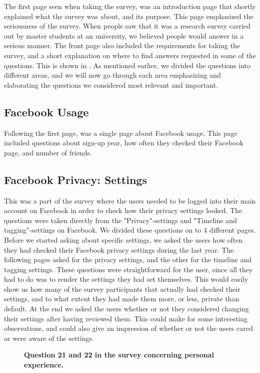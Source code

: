 The first page seen when taking the survey, was an introduction page that shortly explained what the survey was about, and its purpose. This page emphasized the seriousness of the survey. When people saw that it was a research survey carried out by master students at an university, we believed people would answer in a serious manner. The front page also included the requirements for taking the survey, and a short explanation on where to find answers requested in some of the questions. This is shown in . As mentioned earlier, we divided the questions into different areas, and we will now go through each area emphasizing and elaborating the questions we considered most relevant and important. 
 

\subsection{Facebook Usage}
Following the first page, was a single page about Facebook usage. This page included questions about sign-up year, how often they checked their Facebook page, and number of friends. 

\subsection{Facebook Privacy: Settings}
This was a part of the survey where the users needed to be logged into their main account on Facebook in order to check how their privacy settings looked. The questions were taken directly from the "Privacy"-settings and "Timeline and tagging"-settings on Facebook. We divided these questions on to 4 different pages. Before we started asking about specific settings, we asked the users how often they had checked their Facebook privacy settings during the last year. The following pages asked for the privacy settings, and the other for the timeline and tagging settings. These questions were straightforward for the user, since all they had to do was to render the settings they had set themselves. This would easily show us how many of the survey participants that actually had checked their settings, and to what extent they had made them more, or less, private than default. At the end we asked the users whether or not they considered changing their settings after having reviewed them. This could make for some interesting observations, and could also give an impression of whether or not the users cared or were aware of the settings. 

\begin{figure}[t]
\centering
{}
\caption[Question 21 and 22 in the survey concerning personal experience]{\textbf{Question 21 and 22 in the survey concerning personal experience.}} 
\label{fig:page12}
\end{figure}

